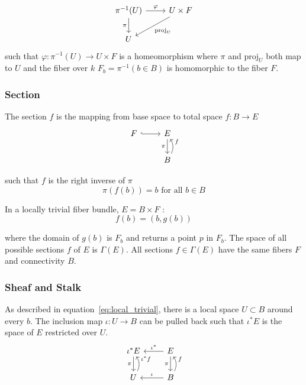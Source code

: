 \documentclass[../main.tex]{subfiles}
\begin{document}
\begin{equation}
    \label{eq:fiber_local_trivial}
    \begin{tikzcd}
        \pi^{-1}(U) \arrow[r, "\varphi"] \arrow[d, "\pi"'] & U \times F \arrow[ld, "\mathrm{proj}_U"] \\
        U                                                  &                                         
    \end{tikzcd}
\end{equation}
such that $\varphi: \pi^{-1}(U) \rightarrow U \times F$ is a homeomorphism where $\pi$ and $\mathrm{proj}_U$ both map to $U$ and the fiber over $k$ $F_b = \pi^{-1}({b \in B}) $ is homomorphic to the fiber $F$.

\subsubsection{Section}
The section $f$ is the mapping from base space to total space $f: B\rightarrow E$ 
\begin{equation}
    \label{eq:section}
    \begin{tikzcd}
        F \arrow[r, hook] & E \arrow[d, "\pi"']           \\
        & B \arrow[u, "f"', bend right]
    \end{tikzcd}
\end{equation}

such that $f$ is the right inverse of $\pi$
\begin{equation}
    \label{eq:section_domain}
    \pi(f(b)) = b \text{ for all } b \in B 
\end{equation}

In a locally trivial fiber bundle, $E = B \times F$ \cite{rowlandFiberBundle,FiberBundle2020}:
\begin{equation}
    \label{eq:section_return}
f(b) = (b, g(b))
\end{equation}

where the domain of $g(b)$ is $F_b$ and returns a point $p$ in $F_b$. The space of all possible sections $f$ of $E$ is $\Gamma(E)$. All sections $f \in \Gamma(E)$ have the same fibers $F$ and connectivity $B$. 

\subsubsection{Sheaf and Stalk}
As described in equation~\ref{eq:local_trivial}, there is a local space $U \subset B$ around every $b$. The inclusion map $\iota: U \rightarrow B$ can be pulled back such that $\iota^{*}E$ is the space of $E$ restricted over $U$. 
\begin{equation}
    \label{eq:sheaf}
    \begin{tikzcd}
        \iota^*E \arrow[d, "\pi"']           & E \arrow[d, "\pi"'] \arrow[l, "\iota^*"']         \\
        U \arrow[u, "\iota^*f"', bend right] & B \arrow[u, "f"', bend right] \arrow[l, "\iota"']
        \end{tikzcd}
\end{equation}
\end{document}
